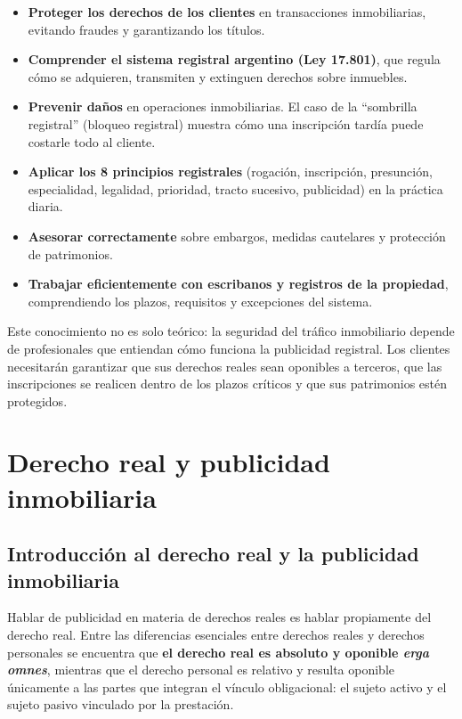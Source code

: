 \documentclass[12pt,oneside]{book}
\begin{document}
\begin{itemize}
    \item \textbf{Proteger los derechos de los clientes} en transacciones inmobiliarias, evitando fraudes y garantizando los títulos.
    \item \textbf{Comprender el sistema registral argentino (Ley 17.801)}, que regula cómo se adquieren, transmiten y extinguen derechos sobre inmuebles.
    \item \textbf{Prevenir daños} en operaciones inmobiliarias. El caso de la ``sombrilla registral'' (bloqueo registral) muestra cómo una inscripción tardía puede costarle todo al cliente.
    \item \textbf{Aplicar los 8 principios registrales} (rogación, inscripción, presunción, especialidad, legalidad, prioridad, tracto sucesivo, publicidad) en la práctica diaria.
    \item \textbf{Asesorar correctamente} sobre embargos, medidas cautelares y protección de patrimonios.
    \item \textbf{Trabajar eficientemente con escribanos y registros de la propiedad}, comprendiendo los plazos, requisitos y excepciones del sistema.
\end{itemize}

Este conocimiento no es solo teórico: la seguridad del tráfico inmobiliario depende de profesionales que entiendan cómo funciona la publicidad registral. Los clientes necesitarán garantizar que sus derechos reales sean oponibles a terceros, que las inscripciones se realicen dentro de los plazos críticos y que sus patrimonios estén protegidos.

\chapter{Derecho real y publicidad inmobiliaria}

\section{Introducción al derecho real y la publicidad inmobiliaria}

Hablar de publicidad en materia de derechos reales es hablar propiamente del derecho real. Entre las diferencias esenciales entre derechos reales y derechos personales se encuentra que \textbf{el derecho real es absoluto y oponible \emph{erga omnes}}, mientras que el derecho personal es relativo y resulta oponible únicamente a las partes que integran el vínculo obligacional: el sujeto activo y el sujeto pasivo vinculado por la prestación.
\end{document}
